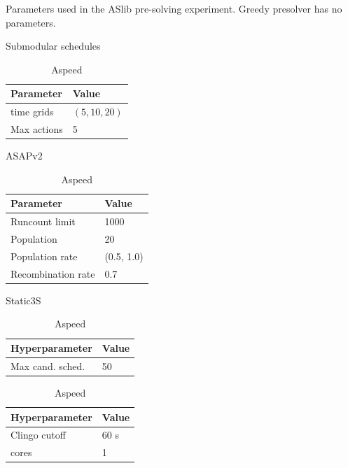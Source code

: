 \begin{table}[!htbp]
  \centering
  \caption[Pre-solving experiment parameters]{Parameters used in the ASlib pre-solving experiment. Greedy presolver has no parameters.}
  \label{tab:aslib_presolving_hyperparameters}
    \begin{subtable}[t]{0.48\textwidth}
    \centering
    \caption{Submodular schedules}
    \begin{tabular}{ll}
      \toprule
      Parameter & Value \\
      \midrule
      time grids & $(5,10,20)$ \\
      Max actions &  5 \\
      \bottomrule
    \end{tabular}%
  \end{subtable}
  \hfill
  \begin{subtable}[t]{0.48\textwidth}
    \centering
    \caption{ASAPv2}
    \begin{tabular}{ll}
      \toprule
      Parameter & Value \\
      \midrule
      Runcount limit & 1000 \\
      Population & 20 \\
      Population rate & (0.5, 1.0) \\
      Recombination rate & 0.7 \\
      \bottomrule
    \end{tabular}%
  \end{subtable}
  \begin{subtable}[t]{0.48\textwidth}
    \centering
    \caption{Static3S}
    \begin{tabular}{ll}
      \toprule
      Hyperparameter & Value \\
      \midrule
      Max cand. sched.  &  50 \\
      \bottomrule
    \end{tabular}%
  \end{subtable}
  \hfill
  \begin{subtable}[t]{0.48\textwidth}
    \centering
    \caption{Aspeed}
    \begin{tabular}{ll}
      \toprule
      Hyperparameter & Value \\
      \midrule
      Clingo cutoff & 60 s \\
      cores & 1 \\
      \bottomrule
    \end{tabular}%
  \end{subtable}
\end{table}

